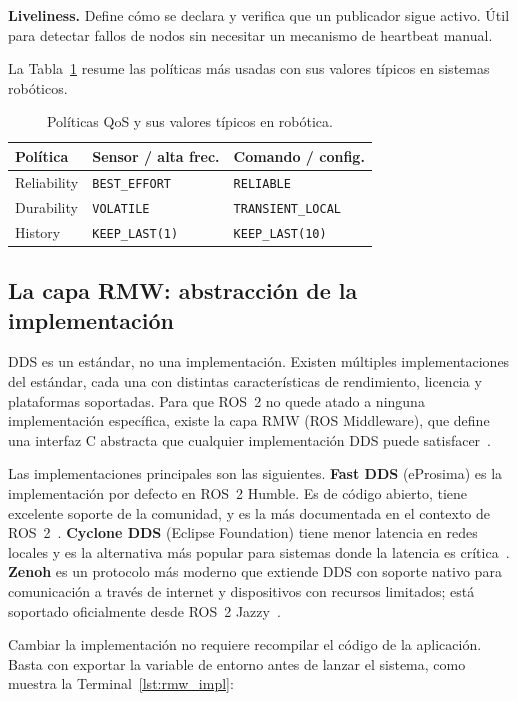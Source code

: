 \textbf{Liveliness.} Define cómo se declara y verifica que un publicador sigue activo. Útil para detectar fallos de nodos sin necesitar un mecanismo de heartbeat manual.

La Tabla~\ref{tab:qos} resume las políticas más usadas con sus valores típicos en sistemas robóticos.

\begin{table}[H]
  \centering
  \caption{Políticas QoS y sus valores típicos en robótica.}
  \label{tab:qos}
  \begin{tabular}{@{}lll@{}}
    \toprule
    Política & Sensor / alta frec. & Comando / config. \\
    \midrule
    Reliability  & \texttt{BEST\_EFFORT} & \texttt{RELIABLE} \\
    Durability   & \texttt{VOLATILE}     & \texttt{TRANSIENT\_LOCAL} \\
    History      & \texttt{KEEP\_LAST(1)} & \texttt{KEEP\_LAST(10)} \\
    \bottomrule
  \end{tabular}
\end{table}

\subsection{La capa RMW: abstracción de la implementación}

DDS es un estándar, no una implementación. Existen múltiples implementaciones del estándar, cada una con distintas características de rendimiento, licencia y plataformas soportadas. Para que ROS~2 no quede atado a ninguna implementación específica, existe la capa RMW (ROS Middleware), que define una interfaz C abstracta que cualquier implementación DDS puede satisfacer~\cite{macenski2022robot}.

Las implementaciones principales son las siguientes. \textbf{Fast DDS} (eProsima) es la implementación por defecto en ROS~2 Humble. Es de código abierto, tiene excelente soporte de la comunidad, y es la más documentada en el contexto de ROS~2~\cite{eprosima2023fastdds}. \textbf{Cyclone DDS} (Eclipse Foundation) tiene menor latencia en redes locales y es la alternativa más popular para sistemas donde la latencia es crítica~\cite{cyclonedds2023}. \textbf{Zenoh} es un protocolo más moderno que extiende DDS con soporte nativo para comunicación a través de internet y dispositivos con recursos limitados; está soportado oficialmente desde ROS~2 Jazzy~\cite{zenoh2023}.

Cambiar la implementación no requiere recompilar el código de la aplicación. Basta con exportar la variable de entorno antes de lanzar el sistema, como muestra la Terminal~\ref{lst:rmw_impl}:

